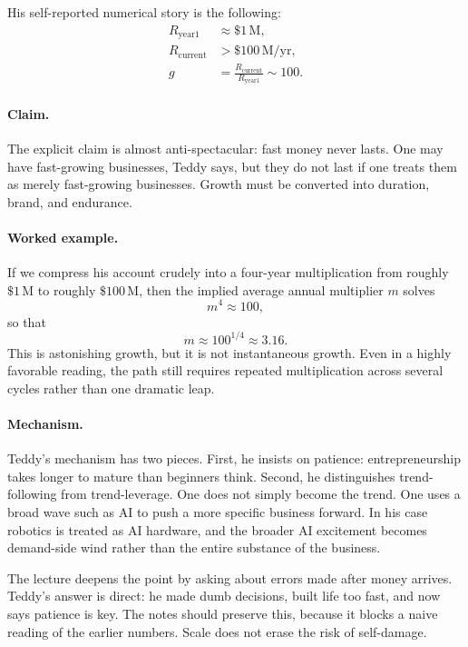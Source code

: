 His self-reported numerical story is the following:
\begin{align}
R_{\mathrm{year1}} &\approx \$1\,\mathrm{M},\\
R_{\mathrm{current}} &> \$100\,\mathrm{M/yr},\\
g &= \frac{R_{\mathrm{current}}}{R_{\mathrm{year1}}} \sim 100.
\end{align}

\paragraph{Claim.}
The explicit claim is almost anti-spectacular: fast money never lasts. One may have fast-growing businesses, Teddy says, but they do not last if one treats them as merely fast-growing businesses. Growth must be converted into duration, brand, and endurance.

\paragraph{Worked example.}
If we compress his account crudely into a four-year multiplication from roughly \(\$1\,\mathrm{M}\) to roughly \(\$100\,\mathrm{M}\), then the implied average annual multiplier \(m\) solves
\begin{equation}
m^4 \approx 100,
\end{equation}
so that
\begin{equation}
m \approx 100^{1/4} \approx 3.16.
\end{equation}
This is astonishing growth, but it is not instantaneous growth. Even in a highly favorable reading, the path still requires repeated multiplication across several cycles rather than one dramatic leap.

\paragraph{Mechanism.}
Teddy's mechanism has two pieces. First, he insists on patience: entrepreneurship takes longer to mature than beginners think. Second, he distinguishes trend-following from trend-leverage. One does not simply become the trend. One uses a broad wave such as AI to push a more specific business forward. In his case robotics is treated as AI hardware, and the broader AI excitement becomes demand-side wind rather than the entire substance of the business.

The lecture deepens the point by asking about errors made after money arrives. Teddy's answer is direct: he made dumb decisions, built life too fast, and now says patience is key. The notes should preserve this, because it blocks a naive reading of the earlier numbers. Scale does not erase the risk of self-damage.

